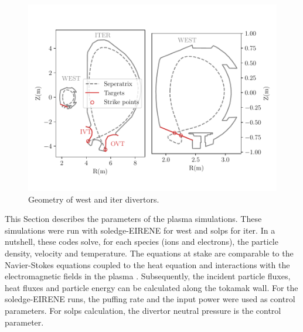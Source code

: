 \begin{figure}[h!]
    \centering
    \includegraphics[width=0.95\linewidth]{Figures/Chapter4/coordinates.pdf}
    \caption{Geometry of \gls{west} and \gls{iter} \glspl{divertor}.}
\end{figure}
This Section describes the parameters of the plasma simulations.
These simulations were run with \gls{soledge}-EIRENE for \gls{west} and \gls{solps} for \gls{iter}.
In a nutshell, these codes solve, for each species (ions and electrons), the particle density, velocity and temperature.
The equations at stake are comparable to the Navier-Stokes equations coupled to the heat equation and interactions with the electromagnetic fields in the \gls{plasma} .
Subsequently, the incident particle fluxes, heat fluxes and particle energy can be calculated along the \gls{tokamak} wall.
For the \gls{soledge}-EIRENE runs, the puffing rate and the input power were used as control parameters.
For \gls{solps} calculation, the \gls{divertor} neutral pressure is the control parameter.

